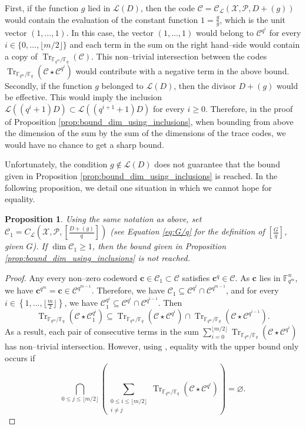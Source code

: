 \documentclass[a4paper]{amsart}
\newtheorem{proposition}[thm]{Proposition}
\theoremstyle{definition}
\theoremstyle{remark}
\newcommand{\calP}{\mathcal{P}}
\newcommand{\calL}{\mathcal{L}}
\newcommand{\calC}{\mathcal{C}}
\newcommand{\calX}{\mathcal{X}}
\newcommand{\fqm}{\mathbb{F}_{q^m}}
\newcommand{\fq}{\mathbb{F}_{q}}
\newcommand{\Tr}[1]{\operatorname{Tr}_{\mathbb{F}_{q^m}/\fq}\left(#1\right)}
\newcommand{\set}[1]{\left\{#1\right\}}
\begin{document}
First, if the function $g$ lied in $\calL(D)$, then the code $\calC= \calC_{\calL}(\calX,\calP,D+(g))$ would contain the evaluation of the constant function $1=\frac{g}{g}$, which is the unit vector $(1,\dots,1)$. In this case, the vector $(1,\dots,1)$ would belong to $\calC^{q^i}$ for every $i \in \{0,\dots, \lfloor{m/2} \rfloor\}$ and each term in the sum on the right hand--side would contain a copy of $\Tr{\calC}$. This non--trivial intersection between the codes $\Tr{\calC\star \calC^{q^i}}$ would contribute with a negative term in the above bound.
Secondly, if the function $g$ belonged to $\calL(D)$, then the divisor $D+(g)$ would be effective. This would imply the inclusion $\calL((q^i+1)D) \subset \calL((q^{i+1}+1)D)$ for every $i \geq 0$. Therefore, in the proof of Proposition \ref{prop:bound_dim_using_inclusions}, when bounding from above the dimension of the sum by the sum of the dimensions of the trace codes, we would have no chance to get a sharp bound.

Unfortunately, the condition $g \notin \calL(D)$ does not guarantee that the bound given in Proposition \ref{prop:bound_dim_using_inclusions} is reached. In the following proposition, we detail one situation in which we cannot hope for equality.

\begin{proposition}\label{prop:non-eq}
	Using the same notation as above, set $\calC_1=C_{\calL}\left(\calX,\mathcal{P},\left[ \frac{D+(g)}{q} \right]\right)$ (see Equation \eqref{eq:G/q} for the definition of $\left[ \frac{G}{q} \right]$, given $G$). If $\dim \calC_1 \geq 1$, then the bound given in Proposition \ref{prop:bound_dim_using_inclusions} is not reached.
\end{proposition}

\begin{proof}
Any every non--zero codeword $\mathbf{c} \in  \calC_1 \subset \calC$ satisfies $\mathbf{c}^q \in \calC$. As $\mathbf{c}$ lies in $\fqm^n$, we have $\mathbf{c}^{q^m}=\mathbf{c} \in \calC^{q^{m-1}}$. Therefore,  we have $\calC_1 \subseteq \calC^{q^i} \cap \calC^{q^{m-1}}$, and for every $i \in \set{1,\dots,\lfloor \frac{m}{2}\rfloor}$, we have $\calC_1^{q^i} \subseteq \calC^{q^i} \cap \calC^{q^{i-1}}$. Then
\[\Tr{\calC\star\calC_1^{q^i}} \subseteq \Tr{\calC\star\calC^{q^i}} \cap \Tr{\calC\star\calC^{q^{i-1}}}.\]
As a result, each pair of consecutive terms in the sum $\sum\limits_{i=0}^{\lfloor m/2 \rfloor} \Tr{\calC \star \calC^{q^i}}$ has non--trivial intersection. However, using \cite[Theorem~2]{T19}, equality with the upper bound only occurs if
\[\bigcap_{0\leq j \leq \lfloor m/2\rfloor} \left( \sum_{\substack{0\leq i \leq \lfloor m/2 \rfloor\\ i\neq j}} \Tr{\calC \star \calC^{q^i}} \right)= \varnothing.\]
\end{proof}
\end{document}

